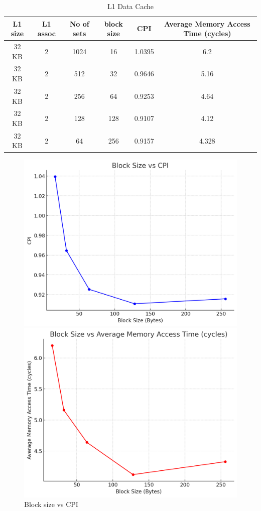 \documentclass{article}
\begin{document}
\begin{table}[h!]
	\centering
	\begin{tabular}{|c|c|c|c|c|c|}
		\hline
		L1 size & L1 assoc & No of sets & block size & CPI & Average Memory Access Time (cycles) \\
		\hline
		32 KB & 2 & 1024 & 16 &  1.0395& 6.2\\
		32 KB & 2 & 512& 32 &  0.9646& 5.16\\
		32 KB & 2 & 256& 64 & 0.9253 & 4.64\\
		32 KB & 2 & 128& 128 &  0.9107& 4.12\\
		32 KB & 2 & 64& 256 & 0.9157 & 4.328\\
		\hline
	\end{tabular}
	\caption{L1 Data Cache}
\end{table}
\begin{figure}[H]
	\centering
	\begin{minipage}{0.48\textwidth}
		\centering
		\includegraphics[scale=0.5]{block_cpi.png}
		\caption{Block size vs CPI}
		\label{fig:block vs cpi}
	\end{minipage}
	\hfill
	\begin{minipage}{0.48\textwidth}
		\centering
		\includegraphics[scale=0.5]{block_amat.png}

\end{minipage}
\end{figure}
\end{document}
